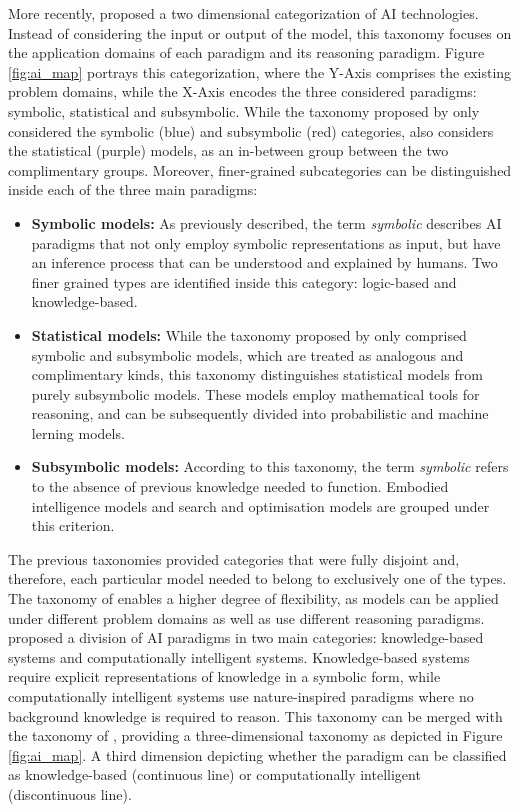 More recently, \cite{corea_ai_2019} proposed a two dimensional categorization of AI technologies. Instead of considering the input or output of the model, this taxonomy focuses on the application domains of each paradigm and its reasoning paradigm. Figure \ref{fig:ai_map} portrays this categorization, where the Y-Axis comprises the existing problem domains, while the X-Axis encodes the three considered paradigms: symbolic, statistical and subsymbolic. While the taxonomy proposed by \cite{lieberman_symbolic_nodate} only considered the symbolic (blue) and subsymbolic (red) categories, \cite{corea_ai_2019} also considers the statistical (purple) models, as an in-between group between the two complimentary groups. Moreover, finer-grained subcategories can be distinguished inside each of the three main paradigms:
\begin{itemize}
    \item \textbf{Symbolic models:} As previously described, the term \textit{symbolic} describes AI paradigms that not only employ symbolic representations as input, but have an inference process that can be understood and explained by humans. Two finer grained types are identified inside this category: logic-based and knowledge-based.
    \item \textbf{Statistical models:} While the taxonomy proposed by \cite{lieberman_symbolic_nodate} only comprised symbolic and subsymbolic models, which are treated as analogous and complimentary kinds, this taxonomy distinguishes statistical models from purely subsymbolic models. These models employ mathematical tools for reasoning, and can be subsequently divided into probabilistic and machine lerning models.
    \item\textbf{Subsymbolic models:} According to this taxonomy, the term \textit{symbolic} refers to the absence of previous knowledge needed to function. Embodied intelligence models and search and optimisation models are grouped under this criterion.
\end{itemize}

The previous taxonomies provided categories that were fully disjoint and, therefore, each particular model needed to belong to exclusively one of the types. The taxonomy of \cite{corea_ai_2019} enables a higher degree of flexibility, as models can be applied under different problem domains as well as use different reasoning paradigms.
\cite{hopgood_2009_knowledge-based} proposed a division of AI paradigms in two main categories: knowledge-based systems and computationally intelligent systems. Knowledge-based systems require explicit representations of knowledge in a symbolic form, while computationally intelligent systems use nature-inspired paradigms where no background knowledge is required to reason. This taxonomy can be merged with the taxonomy of \cite{corea_ai_2019}, providing a three-dimensional taxonomy as depicted in Figure \ref{fig:ai_map}. A third dimension depicting whether the paradigm can be classified as knowledge-based (continuous line) or computationally intelligent (discontinuous line). 

